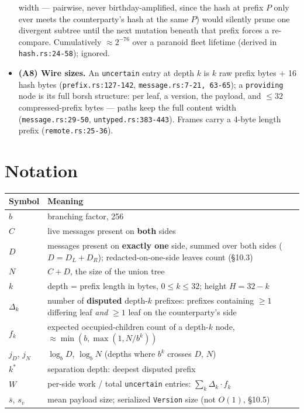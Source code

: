 \documentclass[11pt]{article}
\newcommand{\code}[1]{\texttt{#1}}
\theoremstyle{plain}
\begin{document}
\begin{itemize}
  width --- pairwise, never birthday-amplified, since the hash at prefix
  $P$ only ever meets the counterparty's hash at the same $P$) would
  silently prune one divergent subtree until the next mutation beneath
  that prefix forces a re-compare. Cumulatively ${\approx}2^{-76}$ over a
  paranoid fleet lifetime (derived in \code{hash.rs:24-58}); ignored.
\item \textbf{(A8) Wire sizes.} An \code{uncertain} entry at depth $k$ is
  $k$ raw prefix bytes + 16 hash bytes (\code{prefix.rs:127-142},
  \code{message.rs:7-21, 63-65}); a \code{providing} node is its full borsh
  structure: per leaf, a version, the payload, and $\le 32$
  compressed-prefix bytes --- paths keep the full content width
  (\code{message.rs:29-50}, \code{untyped.rs:383-443}). Frames carry a
  4-byte length prefix (\code{remote.rs:25-36}).
\end{itemize}

\section{Notation}

\begin{center}
\begin{tabular}{@{}lL{0.72\textwidth}@{}}
\toprule
Symbol & Meaning \\
\midrule
$b$ & branching factor, 256 \\
$C$ & live messages present on \textbf{both} sides \\
$D$ & messages present on \textbf{exactly one} side, summed over both sides
  ($D = D_L + D_R$); redacted-on-one-side leaves count (\S10.3) \\
$N$ & $C + D$, the size of the union tree \\
$k$ & depth = prefix length in bytes, $0 \le k \le 32$; height $H = 32 - k$ \\
$\Delta_k$ & number of \textbf{disputed} depth-$k$ prefixes: prefixes
  containing $\ge 1$ differing leaf \emph{and} $\ge 1$ leaf on the
  counterparty's side \\
$f_k$ & expected occupied-children count of a depth-$k$ node,
  $\approx \min(b, \max(1, N/b^k))$ \\
$j_D$, $j_N$ & $\log_b D$, $\log_b N$ (depths where $b^k$ crosses $D$, $N$) \\
$k^*$ & separation depth: deepest disputed prefix \\
$W$ & per-side work / total \code{uncertain} entries:
  $\sum_k \Delta_k \cdot f_k$ \\
$\bar{s}$, $s_v$ & mean payload size; serialized \code{Version} size (not
  $O(1)$, \S10.5) \\
\bottomrule
\end{tabular}
\end{center}
\end{document}
